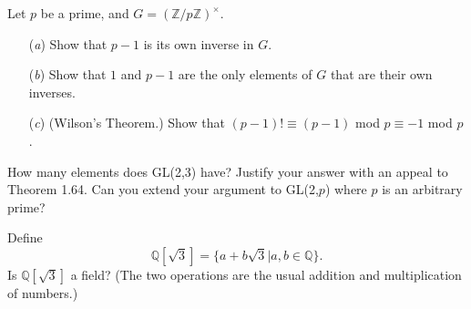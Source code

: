 \documentclass[12pt,letterpaper,boxed]{hmcpset}
\begin{document}

\begin{problem}[1.3.15]
Let $ p $ be a prime, and $ G = (\mathbb{Z}/p\mathbb{Z})^{\times} $.
\begin{itemize}
  \item[(\textit{a})] Show that $ p-1 $ is its own inverse in $ G $.
  
  \item[(\textit{b})] Show that $ 1 $ and $ p-1 $ are the only elements of $ G $ that are their own inverses. 
  
  \item[(\textit{c})] (Wilson's Theorem.) Show that $ (p-1)! \equiv (p-1) $ mod $ p \equiv -1 $ mod $ p $.
\end{itemize}
\end{problem}

\begin{solution}

\end{solution}

\clearpage

\begin{problem}[1.4.4]
How many elements does GL(2,3) have? Justify your answer with an appeal to Theorem 1.64. Can you extend your argument to GL(2,$p$) where $p$ is an arbitrary prime?
\end{problem}

\begin{solution}
\end{solution}

\clearpage

\begin{problem}[1.4.11]
Define $$ \mathbb{Q}[\sqrt{3}] = \{a + b\sqrt{3} \vert a,b \in \mathbb{Q} \}.$$ Is $\mathbb{Q}[\sqrt{3}]$ a field? (The two operations are the usual addition and multiplication of numbers.)
\end{problem}

\begin{solution}
\end{solution}

\clearpage
\end{document}

